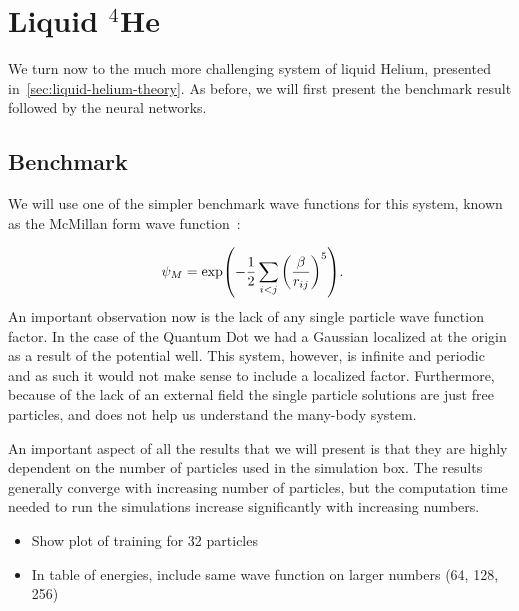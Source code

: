 \documentclass[Thesis.tex]{subfiles}
\begin{document}
\chapter{Liquid $^4$He}
\label{chp:liquid-helium}

We turn now to the much more challenging system of liquid Helium, presented
in~\cref{sec:liquid-helium-theory}. As before, we will first present the
benchmark result followed by the neural networks.


\section{Benchmark}

We will use one of the simpler benchmark wave functions for this system, known
as the McMillan form wave function~\cite{McMillan-1965}:

\begin{align}
  \label{eq:McMillan-wave-function-def}
  \psi_{M} &= \exp(-\frac{1}{2}\sum_{i<j} \qty(\frac{\beta}{r_{ij}})^5).
\end{align}
An important observation now is the lack of any single particle wave
function factor. In the case of the Quantum Dot we had a Gaussian localized at
the origin as a result of the potential well. This system, however, is infinite
and periodic and as such it would not make sense to include a localized factor.
Furthermore, because of the lack of an external field the single particle
solutions are just free particles, and does not help us understand the many-body
system.

An important aspect of all the results that we will present is that they are
highly dependent on the number of particles used in the simulation box. The
results generally converge with increasing number of particles, but the
computation time needed to run the simulations increase significantly with
increasing numbers.

\begin{itemize}
\item Show plot of training for 32 particles
\item In table of energies, include same wave function on larger numbers (64,
  128, 256)
\end{itemize}
\end{document}
